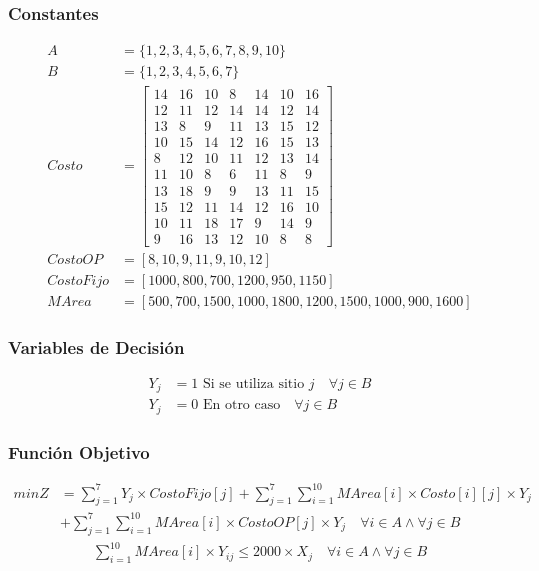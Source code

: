 \documentclass[a4paper,12pt]{article}
\begin{document}
\subsubsection{Constantes}
\begin{equation*}
\begin{split}
A&=\{1,2,3,4,5,6,7,8,9,10\}\\
B&=\{1,2,3,4,5,6,7\}\\
Costo &= \begin{bmatrix}
14 & 16 & 10 & 8 & 14 & 10 & 16\\
12 & 11 & 12 & 14 & 14 & 12 & 14\\
13 & 8 & 9 & 11 & 13 & 15 & 12\\
10 & 15 & 14 & 12 & 16 & 15 & 13\\
8 & 12 & 10 & 11 & 12 & 13 & 14\\
11 & 10 & 8 & 6 & 11 & 8 & 9\\
13 & 18 & 9 & 9 & 13 & 11 & 15\\
15 & 12 & 11 & 14 & 12 & 16 & 10\\
10 & 11 & 18 & 17 & 9 & 14 & 9\\
9 & 16 & 13 & 12 & 10 & 8 & 8
\end{bmatrix}\\
CostoOP&=[8,10,9,11,9,10,12]\\
CostoFijo&=[1000,800,700,1200,950,1150]\\
MArea&=[500,700,1500,1000,1800,1200,1500,1000,900,1600]
\end{split}
\end{equation*}
\subsubsection{Variables de Decisión}
\begin{equation*}
\begin{split}
	Y_j&=1\text{ Si se utiliza sitio } j\quad \forall j \in B\\
	Y_{j}&= 0 \text{ En otro caso}\quad \forall j \in B
\end{split}
\end{equation*}
\subsubsection{Función Objetivo}
\begin{equation*}
\begin{split}
minZ &= \sum_{j=1}^{7}Y_j\times CostoFijo[j] + \sum_{j=1}^{7}\sum_{i=1}^{10}MArea[i]\times Costo[i][j]\times Y_j\\ 
&+ \sum_{j=1}^{7}\sum_{i=1}^{10}MArea[i]\times CostoOP[j]\times Y_j \quad \forall i \in A \wedge \forall j \in B
\end{split}
\end{equation*}
\begin{equation*}
\begin{split}
\sum_{i=1}^{10}MArea[i]\times Y_{ij}\leq 2000\times X_j\quad\forall i\in A \wedge \forall j \in B
\end{split}
\end{equation*}
\end{document}
